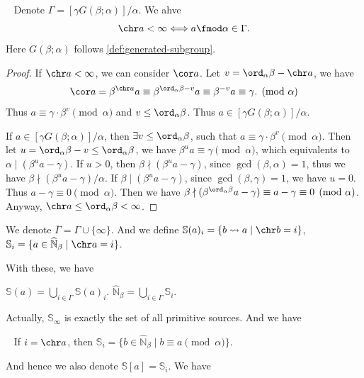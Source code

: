 \begin{proposition}~\label{prop:collatz-character-finite-generated}
    Denote $\Gamma = [\gamma G(\beta;\alpha)]/\alpha$. We ahve
    \[ \chr a <\infty \Longleftrightarrow a\fmod \alpha \in \Gamma. \]
    Here $G(\beta; \alpha)$ follows \cref{def:generated-subgroup}.
\end{proposition}
\begin{proof}
    If $\chr a <\infty$, we can consider $\cor a$. Let $v = \ord_{\alpha}\beta - \chr a$,  we have
    \[ \cor a = \beta^{\chr a}a \equiv\beta^{\ord_{\alpha}\beta - v}a \equiv \beta^{-v}a \equiv\gamma. \pmod{\alpha} \]
    Thus $a\equiv \gamma\cdot\beta^{v} \pmod{\alpha}$ and $v\le \ord_{\alpha}\beta$. Thus $a\in[\gamma G(\beta; \alpha)]/\alpha$.

    If $a\in[\gamma G(\beta; \alpha)]/\alpha$, then $\exists v\le \ord_{\alpha}\beta$, such that $a\equiv \gamma\cdot\beta^{v} \pmod{\alpha}$. Then let $u = \ord_{\alpha}\beta - v \le \ord_{\alpha}\beta$, we have $\beta^{u}a\equiv\gamma \pmod{\alpha}$, which equivalents to $\alpha \mid (\beta^{u}a-\gamma)$. If $u > 0$, then $\beta\nmid(\beta^{u}a-\gamma)$, since $\gcd(\beta, \alpha) = 1$, thus we have $\beta\nmid (\beta^{u}a-\gamma)/\alpha$. If $\beta\mid(\beta^{u}a-\gamma)$, since $\gcd(\beta, \gamma) = 1$, we have $u = 0$. Thus $a-\gamma \equiv 0 \pmod{\alpha}$. Then we have $\beta\nmid (\beta^{\ord_{\alpha}\beta}a-\gamma) \equiv a-\gamma \equiv 0 \pmod{\alpha}$. Anyway, $\chr a\le \ord_{\alpha}\beta < \infty$.
\end{proof}
\begin{definition}
    We denote $\overline{\Gamma} = \Gamma \cup\{\infty\}$.
    And we define $\mathbb{S}(a)_{i} = \{ b\rightsquigarrow a \mid \chr b = i \}$, $\mathbb{S}_{i} = \{ a\in\widehat{\mathbb{N}}_{\beta} \mid \chr a = i \}$.
\end{definition}
With these, we have
\begin{proposition}
    $\mathbb{S}(a) = \bigcup_{i\in\overline{\Gamma}}\mathbb{S}(a)_{i}$. $\widehat{\mathbb{N}}_{\beta} = \bigcup_{i\in\overline{\Gamma}}\mathbb{S}_{i}$.
\end{proposition}
Actually, $\mathbb{S}_{\infty}$ is exactly the set of all primitive sources. And we have
\begin{proposition}~\label{prop:chr-are-periodic}
    If $i = \chr a$, then $\mathbb{S}_{i} = \{ b\in\widehat{\mathbb{N}}_{\beta} \mid b \equiv a \pmod{\alpha} \}$.
\end{proposition}
And hence we also denote $\mathbb{S}[a] = \mathbb{S}_i$. We have
